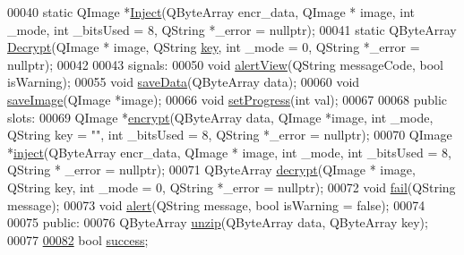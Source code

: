 \begin{DoxyCode}
00040     \textcolor{keyword}{static} QImage *\hyperlink{class_model_p_c_ac17e68e6aab134621b0d151d74acdc82}{Inject}(QByteArray encr\_data, QImage * image, \textcolor{keywordtype}{int} \_mode, \textcolor{keywordtype}{int} \_bitsUsed = 8, QString
       *\_error = \textcolor{keyword}{nullptr});
00041     \textcolor{keyword}{static} QByteArray \hyperlink{class_model_p_c_a902abaea4f07995b48c0f2fea6eceb7c}{Decrypt}(QImage * image, QString \hyperlink{namespace_errors_dict_setup_a09c268098d09ffb8e5504f30fa6d5dd9}{key}, \textcolor{keywordtype}{int} \_mode = 0, QString *\_error = \textcolor{keyword}{
      nullptr});
00042 
00043 signals:
00050     \textcolor{keywordtype}{void} \hyperlink{class_model_p_c_af0217a7ca5671e26090dc50a5dccdaf5}{alertView}(QString messageCode, \textcolor{keywordtype}{bool} isWarning);
00055     \textcolor{keywordtype}{void} \hyperlink{class_model_p_c_a0855107fb0ccc247cd9e893fae9bb08a}{saveData}(QByteArray data);
00060     \textcolor{keywordtype}{void} \hyperlink{class_model_p_c_a41f5e2e8022679046e4d3fa1109025fa}{saveImage}(QImage *image);
00066     \textcolor{keywordtype}{void} \hyperlink{class_model_p_c_afdcd80f0ed5062e145a71f09b0897547}{setProgress}(\textcolor{keywordtype}{int} val);
00067 
00068 \textcolor{keyword}{public} slots:
00069     QImage *\hyperlink{class_model_p_c_a6f191f62d4635d0d3555fcc0be298794}{encrypt}(QByteArray data, QImage *image, \textcolor{keywordtype}{int} \_mode, QString key = \textcolor{stringliteral}{""}, \textcolor{keywordtype}{int} \_bitsUsed = 8, 
      QString *\_error = \textcolor{keyword}{nullptr});
00070     QImage *\hyperlink{class_model_p_c_aada6a04d81ada8f2b4ba18108c8d6f10}{inject}(QByteArray encr\_data, QImage * image, \textcolor{keywordtype}{int} \_mode, \textcolor{keywordtype}{int} \_bitsUsed = 8, QString *
      \_error = \textcolor{keyword}{nullptr});
00071     QByteArray \hyperlink{class_model_p_c_a5995215a34a1e1f504035715a8013809}{decrypt}(QImage * image, QString key, \textcolor{keywordtype}{int} \_mode = 0, QString *\_error = \textcolor{keyword}{nullptr});
00072     \textcolor{keywordtype}{void} \hyperlink{class_model_p_c_a47464b59b7e37fcee25e55475708aabd}{fail}(QString message);
00073     \textcolor{keywordtype}{void} \hyperlink{class_model_p_c_a9079a101d83672aa48fd2dbac797de40}{alert}(QString message, \textcolor{keywordtype}{bool} isWarning = \textcolor{keyword}{false});
00074 
00075 \textcolor{keyword}{public}:
00076     QByteArray \hyperlink{class_model_p_c_a6da88f166785a49f73b22c169f956fd0}{unzip}(QByteArray data, QByteArray key);
00077 
\hypertarget{modelpc_8h_source.tex_l00082}{}\hyperlink{class_model_p_c_a945ffbbc44a832b953c191debd448f4c}{00082}     \textcolor{keywordtype}{bool} \hyperlink{class_model_p_c_a945ffbbc44a832b953c191debd448f4c}{success};

\end{DoxyCode}
